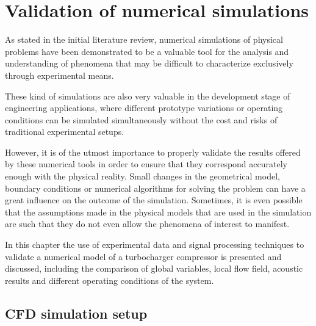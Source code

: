 \chapter{Validation of numerical simulations}
\label{cap:cfd}

\noindent As stated in the initial literature review, numerical simulations of physical problems have been demonstrated to be a valuable tool for the analysis and understanding of phenomena that may be difficult to characterize exclusively through experimental means.

These kind of simulations are also very valuable in the development stage of engineering applications, where different prototype variations or operating conditions can be simulated simultaneously without the cost and risks of traditional experimental setups. 

However, it is of the utmost importance to properly validate the results offered by these numerical tools in order to ensure that they correspond accurately enough with the physical reality. Small changes in the geometrical model, boundary conditions or numerical algorithms for solving the problem can have a great influence on the outcome of the simulation. Sometimes, it is even possible that the assumptions made in the physical models that are used in the simulation are such that they do not even allow the phenomena of interest to manifest.

In this chapter the use of experimental data and signal processing techniques to validate a numerical model of a turbocharger compressor is presented and discussed, including the comparison of global variables, local flow field, acoustic results and different operating conditions of the system. 

\section{CFD simulation setup}

